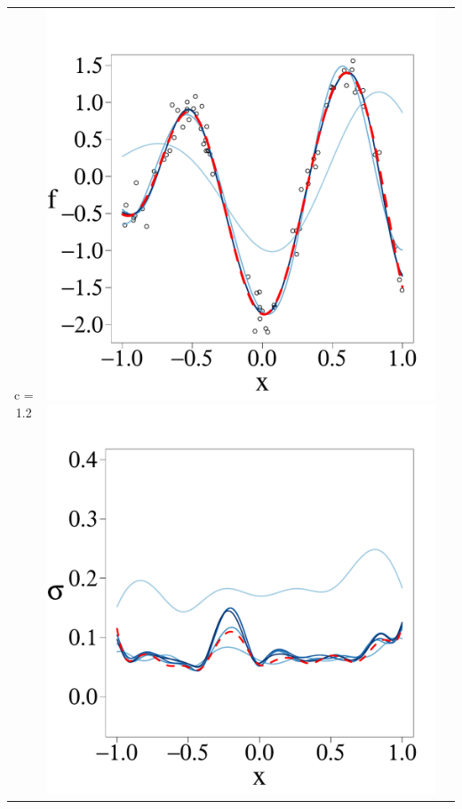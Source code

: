 \documentclass[8pt]{beamer} %
\begin{document}
\begin{frame}
\begin{itemize}
\begin{adjustwidth}{-4.3em}{-3em}
\begin{tabular}{ c c c }
\hline
c = 1.2 &
\includegraphics[scale=0.17, trim = 0mm 4mm 0mm 14mm, clip]{ch5_fig3_Post_part3.pdf} 
\includegraphics[scale=0.17, trim = 0mm 4mm 0mm 14mm, clip]{ch5_fig3_Sigma_part3.pdf} 

\end{tabular}
\end{adjustwidth}
\end{itemize}
\end{frame}
\end{document}
